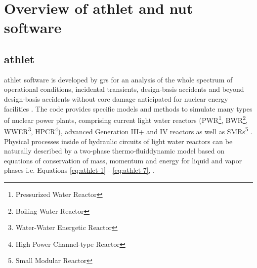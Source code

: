 \chapter{Overview of \acrshort{athlet} and \acrshort{nut} software}\label{chapter:athlet-nut}

\section{\acrshort{athlet}}
\label{sec:athlet-overview}




\acrfull{athlet} software is developed by \acrshort{grs} for an analysis of the whole spectrum of operational conditions, incidental transients, design-basis accidents and beyond design-basis accidents without core damage anticipated for nuclear energy facilities \cite{grs:athlet-info}. The code provides specific models and methods to simulate many types of nuclear power plants, comprising current light water reactors (PWR\footnote{Pressurized Water Reactor}, BWR\footnote{Boiling Water Reactor}, WWER\footnote{Water-Water Energetic Reactor}, HPCR\footnote{High Power Channel-type Reactor}), advanced Generation III+ and IV reactors as well as SMRs\footnote{Small Modular Reactor} \cite{grs:athlet-info}.\\



Physical processes inside of hydraulic circuits of light water reactors can be naturally described by a two-phase thermo-fluiddynamic model based on equations of conservation of mass, momentum and energy for liquid and vapor phases i.e. Equations \ref{eq:athlet-1} - \ref{eq:athlet-7}, \cite{lt:ATHLMaM}.\\

